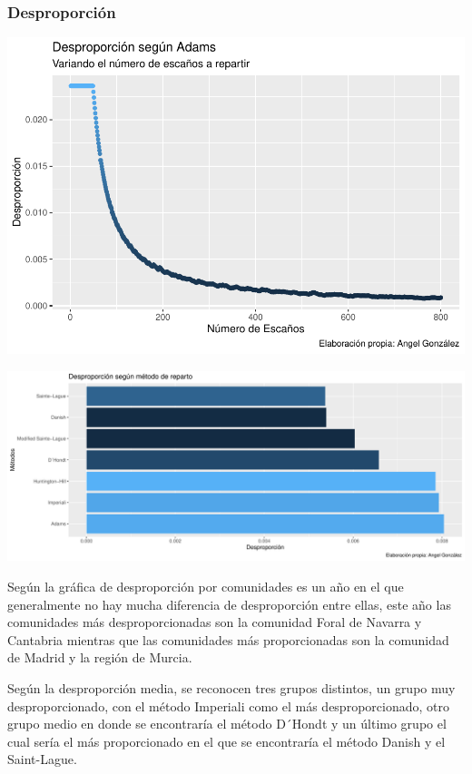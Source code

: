 \documentclass[12pt,a4paper,]{book}
\numberwithin{dummy}{section}
\theoremstyle{ocrenumbox}
\theoremstyle{blacknumex}
\theoremstyle{blacknumbox}
\theoremstyle{ocrenum}
\theoremstyle{ocrenum}
\begin{document}
\hypertarget{desproporciuxf3n-2}{%
\subsubsection{Desproporción}\label{desproporciuxf3n-2}}

\begin{center}\includegraphics[width=0.95\linewidth]{figurasR/unnamed-chunk-30-1} \end{center}

\begin{center}\includegraphics[width=0.95\linewidth]{figurasR/unnamed-chunk-30-2} \end{center}

Según la gráfica de desproporción por comunidades es un año en el que
generalmente no hay mucha diferencia de desproporción entre ellas, este
año las comunidades más desproporcionadas son la comunidad Foral de
Navarra y Cantabria mientras que las comunidades más proporcionadas son
la comunidad de Madrid y la región de Murcia.

Según la desproporción media, se reconocen tres grupos distintos, un
grupo muy desproporcionado, con el método Imperiali como el más
desproporcionado, otro grupo medio en donde se encontraría el método
D´Hondt y un último grupo el cual sería el más proporcionado en el que
se encontraría el método Danish y el Saint-Lague.
\end{document}
